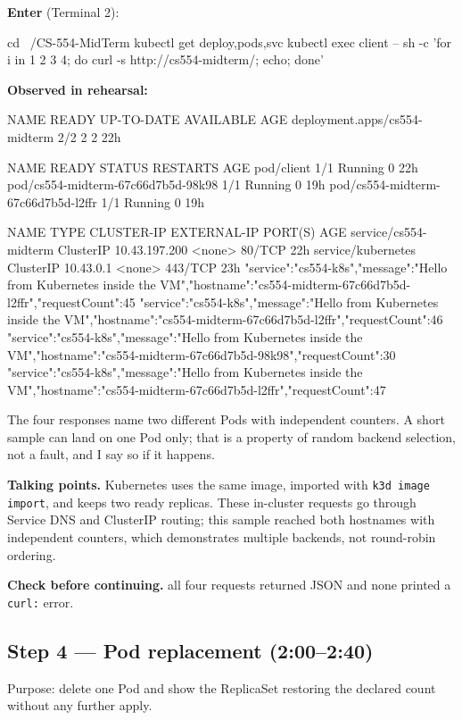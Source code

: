 \documentclass[11pt,letterpaper]{article}
\newcommand{\code}[1]{\texttt{#1}}
\newcommand{\talk}[1]{\begin{shaded*}\noindent\textbf{Talking points.} #1\end{shaded*}}
\newcommand{\enter}[1]{\par\noindent\textbf{Enter} (#1):\par}
\newcommand{\observed}{\par\noindent\textbf{Observed in rehearsal:}\par}
\newcommand{\checkpoint}[1]{\par\noindent\textbf{Check before continuing.} #1\par}
\begin{document}
\enter{Terminal 2}
\begin{cmd}
cd ~/CS-554-MidTerm
kubectl get deploy,pods,svc
kubectl exec client -- sh -c 'for i in 1 2 3 4; do curl -s http://cs554-midterm/; echo; done'
\end{cmd}
\observed
\begin{out}
NAME                            READY   UP-TO-DATE   AVAILABLE   AGE
deployment.apps/cs554-midterm   2/2     2            2           22h

NAME                                 READY   STATUS    RESTARTS   AGE
pod/client                           1/1     Running   0          22h
pod/cs554-midterm-67c66d7b5d-98k98   1/1     Running   0          19h
pod/cs554-midterm-67c66d7b5d-l2ffr   1/1     Running   0          19h

NAME                    TYPE        CLUSTER-IP      EXTERNAL-IP   PORT(S)   AGE
service/cs554-midterm   ClusterIP   10.43.197.200   <none>        80/TCP    22h
service/kubernetes      ClusterIP   10.43.0.1       <none>        443/TCP   23h
{"service":"cs554-k8s","message":"Hello from Kubernetes inside the VM","hostname":"cs554-midterm-67c66d7b5d-l2ffr","requestCount":45}
{"service":"cs554-k8s","message":"Hello from Kubernetes inside the VM","hostname":"cs554-midterm-67c66d7b5d-l2ffr","requestCount":46}
{"service":"cs554-k8s","message":"Hello from Kubernetes inside the VM","hostname":"cs554-midterm-67c66d7b5d-98k98","requestCount":30}
{"service":"cs554-k8s","message":"Hello from Kubernetes inside the VM","hostname":"cs554-midterm-67c66d7b5d-l2ffr","requestCount":47}
\end{out}
The four responses name two different Pods with independent counters. A short sample can land on one Pod only; that is a property of random backend selection, not a fault, and I say so if it happens.
\talk{Kubernetes uses the same image, imported with \code{k3d image import}, and keeps two ready replicas. These in-cluster requests go through Service DNS and ClusterIP routing; this sample reached both hostnames with independent counters, which demonstrates multiple backends, not round-robin ordering.}
\checkpoint{all four requests returned JSON and none printed a \code{curl:} error.}

\subsection*{Step 4 --- Pod replacement (2:00--2:40)}
Purpose: delete one Pod and show the ReplicaSet restoring the declared count without any further apply.
\end{document}
